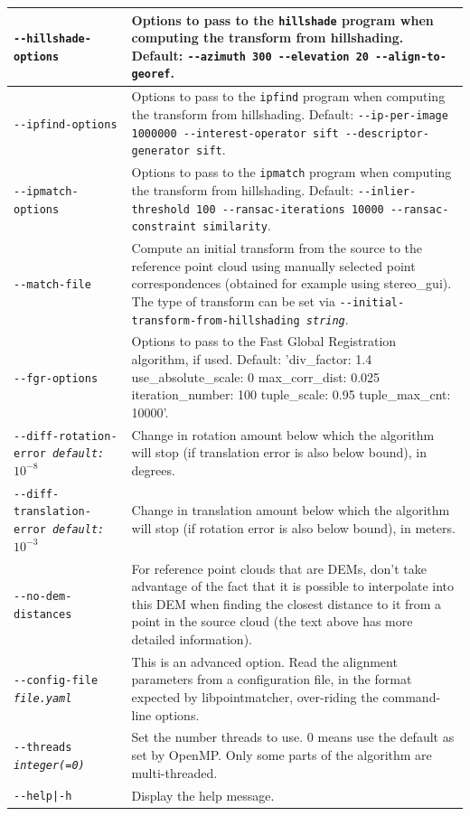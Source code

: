 \begin{longtable}{|p{8cm}|p{9cm}|}
\texttt{-\/-hillshade-options} & Options to pass to the \texttt{hillshade} program when computing the transform from hillshading. Default: \texttt{-\/-azimuth 300 -\/-elevation 20 -\/-align-to-georef}. \\ \hline

\texttt{-\/-ipfind-options} & Options to pass to the \texttt{ipfind} program when computing the transform from hillshading. Default: \texttt{-\/-ip-per-image 1000000 -\/-interest-operator sift -\/-descriptor-generator sift}. \\ \hline

\texttt{-\/-ipmatch-options} & Options to pass to the \texttt{ipmatch} program when computing the transform from hillshading. Default: \texttt{-\/-inlier-threshold 100 -\/-ransac-iterations 10000 -\/-ransac-constraint similarity}. \\ \hline

\texttt{-\/-match-file} & Compute an initial transform from the source to the reference point cloud using manually selected point correspondences (obtained for example using stereo\_gui).  The type of transform can be set via \texttt{-\/-initial-transform-from-hillshading \textit{string}}.\\ \hline

\texttt{-\/-fgr-options} & Options to pass to the Fast Global Registration algorithm, if used. Default: 'div\_factor: 1.4 use\_absolute\_scale: 0 max\_corr\_dist: 0.025 iteration\_number: 100 tuple\_scale: 0.95 tuple\_max\_cnt: 10000'. \\ \hline

\texttt{-\/-diff-rotation-error \textit{default: $10^{-8}$}} & Change in rotation amount below which the algorithm will stop (if translation error is also below bound), in degrees. \\ \hline
\texttt{-\/-diff-translation-error \textit{default: $10^{-3}$}} & Change in translation amount below which the algorithm will stop (if rotation error is also below bound), in meters. \\ \hline

\texttt{-\/-no-dem-distances} & For reference point clouds that are DEMs, don't take advantage of the fact that it is possible to interpolate into this DEM when finding the closest distance to it from a point in the source cloud (the text above has more detailed information). \\ \hline

\texttt{-\/-config-file \textit{file.yaml}} & This is an advanced
option. Read the alignment parameters from a configuration file, in the
format expected by libpointmatcher, over-riding the command-line options.\\ \hline

\texttt{-\/-threads \textit{integer(=0)}} & Set the number threads to
use. 0 means use the default as set by OpenMP. Only some parts of the algorithm are multi-threaded.\\ \hline

\texttt{-\/-help|-h} & Display the help message.\\ \hline
\end{longtable}

